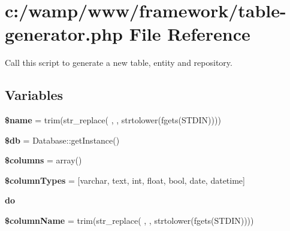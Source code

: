 \hypertarget{table-generator_8php}{}\section{c\+:/wamp/www/framework/table-\/generator.php File Reference}
\label{table-generator_8php}


Call this script to generate a new table, entity and repository.  


\subsection*{Variables}
\begin{DoxyCompactItemize}
\item 
{\bfseries \$name} = trim(str\+\_\+replace(\textquotesingle{} \textquotesingle{}, \textquotesingle{}\textquotesingle{}, strtolower(fgets(S\+T\+D\+IN))))\hypertarget{table-generator_8php_ab2fc40d43824ea3e1ce5d86dee0d763b}{}\label{table-generator_8php_ab2fc40d43824ea3e1ce5d86dee0d763b}

\item 
{\bfseries \$db} = Database\+::get\+Instance()\hypertarget{table-generator_8php_a1fa3127fc82f96b1436d871ef02be319}{}\label{table-generator_8php_a1fa3127fc82f96b1436d871ef02be319}

\item 
{\bfseries \$columns} = array()\hypertarget{table-generator_8php_a19d2a3d21fe02053311fde465e6ae2e9}{}\label{table-generator_8php_a19d2a3d21fe02053311fde465e6ae2e9}

\item 
{\bfseries \$column\+Types} = \mbox{[}\textquotesingle{}varchar\textquotesingle{}, \textquotesingle{}text\textquotesingle{}, \textquotesingle{}int\textquotesingle{}, \textquotesingle{}float\textquotesingle{}, \textquotesingle{}bool\textquotesingle{}, \textquotesingle{}date\textquotesingle{}, \textquotesingle{}datetime\textquotesingle{}\mbox{]}\hypertarget{table-generator_8php_a024b085abf9bc5e169be390075bdd754}{}\label{table-generator_8php_a024b085abf9bc5e169be390075bdd754}

\item 
{\bfseries do}
\item 
{\bfseries \$column\+Name} = trim(str\+\_\+replace(\textquotesingle{} \textquotesingle{}, \textquotesingle{}\textquotesingle{}, strtolower(fgets(S\+T\+D\+IN))))\hypertarget{table-generator_8php_a891e1698a62c1a0452001186161b2316}{}\label{table-generator_8php_a891e1698a62c1a0452001186161b2316}


\end{DoxyCompactItemize}
